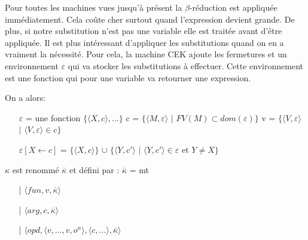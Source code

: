 \documentclass[10pt,a4paper]{article}
\begin{document}
				Pour toutes les machines vues jusqu'à présent la $\beta$-réduction est appliquée immédiatement. Cela coûte cher surtout quand l'expression devient grande. De plus, si notre substitution n'est pas une variable elle est traitée avant d'être appliquée.
				\smallbreak
				Il est plus intéressant d'appliquer les substitutions quand on en a vraiment la nécessité. Pour cela, la machine CEK ajoute les fermetures et un environnement $\varepsilon$ qui va stocker les substitutions à effectuer. Cette environnement est une fonction qui pour une variable va retourner une expression.
				\medbreak
				
				On a alors:
				\begin{itemize}
					\item[] $\varepsilon$ = une fonction $\{\langle X,c\rangle,...\}$    c = $\{\langle M,\varepsilon\rangle$ $|$ $FV(M)\subset dom(\varepsilon)\}$    v = $\{\langle V,\varepsilon\rangle$ $|$ $\langle V,\varepsilon\rangle \in c\}$
					\item[] $\varepsilon[X \leftarrow c]$ = $\{\langle X,c\rangle\}$ $\cup$ $\{\langle Y,c'\rangle$ $|$ $\langle Y,c'\rangle \in \varepsilon$ et $ Y \neq X\}$
				\end{itemize}
				\medbreak
				
				$\kappa$ est renommé $\overline{\kappa}$ et défini par :
				\smallbreak
				$\overline{\kappa}$ = mt
				\begin{itemize}
					\item[|] $\langle fun,v,\overline{\kappa} \rangle$
					\item[|] $\langle arg,c,\overline{\kappa} \rangle$
					\item[|] $\langle opd,\langle v,...,v,o^{n}\rangle,\langle c,... \rangle,\overline{\kappa} \rangle$
				\end{itemize}
				\bigbreak
				
\end{document}
